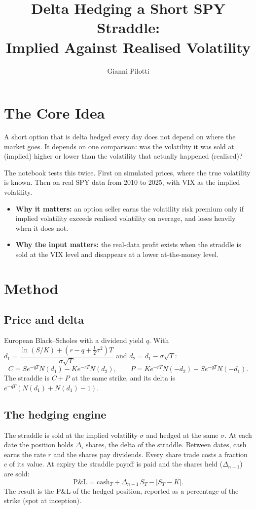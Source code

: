 \documentclass[11pt,a4paper]{article}
\title{Delta Hedging a Short SPY Straddle:\\Implied Against Realised Volatility}
\author{Gianni Pilotti}
\date{}
\begin{document}
\maketitle

\section{The Core Idea}
A short option that is delta hedged every day does not depend on where the market goes. It depends on one comparison: was the volatility it was sold at (implied) higher or lower than the volatility that actually happened (realised)?

The notebook tests this twice. First on simulated prices, where the true volatility is known. Then on real SPY data from 2010 to 2025, with VIX as the implied volatility.

\begin{itemize}
\item \textbf{Why it matters:} an option seller earns the volatility risk premium only if implied volatility exceeds realised volatility on average, and loses heavily when it does not.
\item \textbf{Why the input matters:} the real-data profit exists when the straddle is sold at the VIX level and disappears at a lower at-the-money level.
\end{itemize}

\section{Method}
\subsection{Price and delta}
European Black--Scholes with a dividend yield $q$. With $d_1=\dfrac{\ln(S/K)+(r-q+\tfrac12\sigma^2)T}{\sigma\sqrt T}$ and $d_2=d_1-\sigma\sqrt T$:
\[
C=Se^{-qT}N(d_1)-Ke^{-rT}N(d_2),\qquad
P=Ke^{-rT}N(-d_2)-Se^{-qT}N(-d_1).
\]
The straddle is $C+P$ at the same strike, and its delta is $e^{-qT}\left(N(d_1)+N(d_1)-1\right)$.

\subsection{The hedging engine}
The straddle is sold at the implied volatility $\sigma$ and hedged at the same $\sigma$. At each date the position holds $\Delta_i$ shares, the delta of the straddle. Between dates, cash earns the rate $r$ and the shares pay dividends. Every share trade costs a fraction $c$ of its value. At expiry the straddle payoff is paid and the shares held ($\Delta_{n-1}$) are sold:
\[
\text{P\&L}=\text{cash}_T+\Delta_{n-1}\,S_T-|S_T-K| .
\]
The result is the P\&L of the hedged position, reported as a percentage of the strike (spot at inception).
\end{document}
